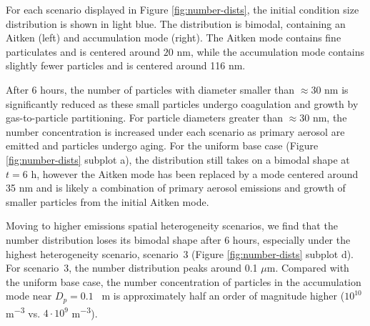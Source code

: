 For each scenario displayed in Figure \ref{fig:number-dists}, the initial condition size distribution is shown in light blue. The distribution is bimodal, containing an Aitken (left) and accumulation mode (right). The Aitken mode contains fine particulates and is centered around $20$ nm, while the accumulation mode contains slightly fewer particles and is centered around 116 nm. 

After 6 hours, the number of particles with diameter smaller than $\approx30$ nm is significantly reduced as these small particles undergo coagulation and growth by gas-to-particle partitioning. For particle diameters greater than $\approx30$ nm, the number concentration is increased under each scenario as primary aerosol are emitted and particles undergo aging. For the uniform base case (Figure \ref{fig:number-dists} subplot a), the distribution still takes on a bimodal shape at $t=6$ h, however the Aitken mode has been replaced by a mode centered around 35 nm and is likely a combination of primary aerosol emissions and growth of smaller particles from the initial Aitken mode. 

Moving to higher emissions spatial heterogeneity scenarios, we find that the number distribution loses its bimodal shape after 6 hours, especially under the highest heterogeneity scenario, scenario~3 (Figure \ref{fig:number-dists} subplot d). For scenario~3, the number distribution peaks around 0.1 $\mu$m. Compared with the uniform base case, the number concentration of particles in the accumulation mode near $D_p = 0.1$ \si{\mu m} is approximately half an order of magnitude higher ($10^{10}$ \si{m^{-3}} vs. $4\cdot10^9$ \si{m^{-3}}).

